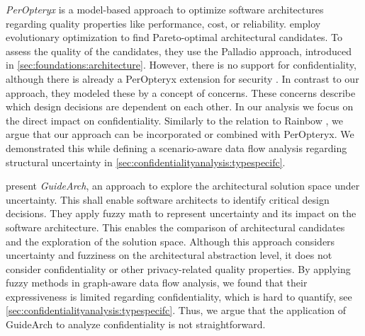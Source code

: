 \emph{PerOpteryx} \cite{koziolek_peropteryx_2011,martens_automatically_2010,koziolek_automated_2011} is a model-based approach to optimize software architectures regarding quality properties like performance, cost, or reliability.
\textcite{koziolek_peropteryx_2011} employ evolutionary optimization to find Pareto-optimal architectural candidates.
To assess the quality of the candidates, they use the Palladio approach, introduced in \autoref{sec:foundations:architecture}.
However, there is no support for confidentiality, although there is already a PerOpteryx extension for security \cite{busch_modelling_2016}.
In contrast to our approach, they modeled these by a concept of concerns. 
These concerns describe which design decisions are dependent on each other. 
In our analysis we focus on the direct impact on confidentiality.
Similarly to the relation to Rainbow \cite{garlan_rainbow_2004}, we argue that our approach can be incorporated or combined with PerOpteryx.
We demonstrated this while defining a scenario-aware data flow analysis regarding structural uncertainty in \autoref{sec:confidentialityanalysis:typespecifc}.

\textcite{esfahani_guidearch_2013} present \emph{GuideArch}, an approach to explore the architectural solution space under uncertainty. 
This shall enable software architects to identify critical design decisions.
They apply fuzzy math to represent uncertainty and its impact on the software architecture.
This enables the comparison of architectural candidates and the exploration of the solution space.
Although this approach considers uncertainty and fuzziness on the architectural abstraction level, it does not consider confidentiality or other privacy-related quality properties.
By applying fuzzy methods in graph-aware data flow analysis, we found that their expressiveness is limited regarding confidentiality, which is hard to quantify, see \autoref{sec:confidentialityanalysis:typespecifc}.
Thus, we argue that the application of GuideArch to analyze confidentiality is not straightforward.

